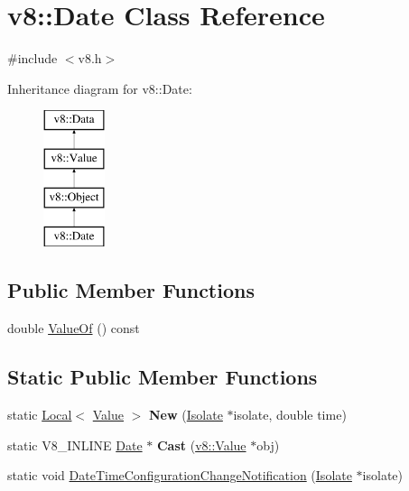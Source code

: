 \hypertarget{classv8_1_1_date}{}\section{v8\+:\+:Date Class Reference}
\label{classv8_1_1_date}


{\ttfamily \#include $<$v8.\+h$>$}

Inheritance diagram for v8\+:\+:Date\+:\begin{figure}[H]
\begin{center}
\leavevmode
\includegraphics[height=4.000000cm]{classv8_1_1_date}
\end{center}
\end{figure}
\subsection*{Public Member Functions}
\begin{DoxyCompactItemize}
\item 
double \hyperlink{classv8_1_1_date_a06800409271fe5fa74202e0fd1ec8e87}{Value\+Of} () const 
\end{DoxyCompactItemize}
\subsection*{Static Public Member Functions}
\begin{DoxyCompactItemize}
\item 
\hypertarget{classv8_1_1_date_a5f93eb196aa81f4564a8903aeb88cabb}{}static \hyperlink{classv8_1_1_local}{Local}$<$ \hyperlink{classv8_1_1_value}{Value} $>$ {\bfseries New} (\hyperlink{classv8_1_1_isolate}{Isolate} $\ast$isolate, double time)\label{classv8_1_1_date_a5f93eb196aa81f4564a8903aeb88cabb}

\item 
\hypertarget{classv8_1_1_date_a8e5ea7c1f28924b82922270d6596b4d3}{}static V8\+\_\+\+I\+N\+L\+I\+N\+E \hyperlink{classv8_1_1_date}{Date} $\ast$ {\bfseries Cast} (\hyperlink{classv8_1_1_value}{v8\+::\+Value} $\ast$obj)\label{classv8_1_1_date_a8e5ea7c1f28924b82922270d6596b4d3}

\item 
static void \hyperlink{classv8_1_1_date_adb084ec0683d3d195ad0f78af5f6f72b}{Date\+Time\+Configuration\+Change\+Notification} (\hyperlink{classv8_1_1_isolate}{Isolate} $\ast$isolate)
\end{DoxyCompactItemize}


